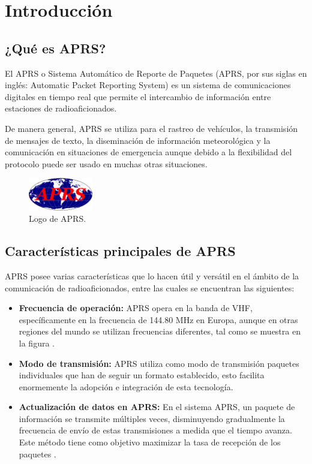 \chapter{Introducción}
\label{cap:introduccion}

\section{¿Qué es APRS?}

El APRS o Sistema Automático de Reporte de Paquetes (APRS, por sus siglas en inglés: Automatic Packet Reporting System) es un sistema de comunicaciones digitales en tiempo real que permite el intercambio de información entre estaciones de radioaficionados.

De manera general, APRS se utiliza para el rastreo de vehículos, la transmisión de mensajes de texto, la diseminación de información meteorológica y la comunicación en situaciones de emergencia aunque debido a la flexibilidad del protocolo puede ser usado en muchas otras situaciones.

\begin{figure}[h!]
	\centering
	\includegraphics[width=0.25\textwidth]{Imagenes/Chapter_1/APRS_logo.png}
	\caption{Logo de APRS.}
	\label{fig:aprs-logo-es}
\end{figure}

\section{Características principales de APRS}

APRS posee varias características que lo hacen útil y versátil en el ámbito de la comunicación de radioaficionados, entre las cuales se encuentran las siguientes:
\begin{itemize}
	\item \textbf{Frecuencia de operación:} APRS opera en la banda de VHF, específicamente en la frecuencia de 144.80 MHz en Europa, aunque en otras regiones del mundo se utilizan frecuencias diferentes, tal como se muestra en la figura .
	\item \textbf{Modo de transmisión:} APRS utiliza como modo de transmisión paquetes individuales que han de seguir un formato establecido, esto facilita enormemente la adopción e integración de esta tecnología.
	\item \textbf{Actualización de datos en APRS:} En el sistema APRS, un paquete de información se transmite múltiples veces, disminuyendo gradualmente la frecuencia de envío de estas transmisiones a medida que el tiempo avanza. Este método tiene como objetivo maximizar la tasa de recepción de los paquetes \cite{QueEsAPRS}.
\end{itemize}

